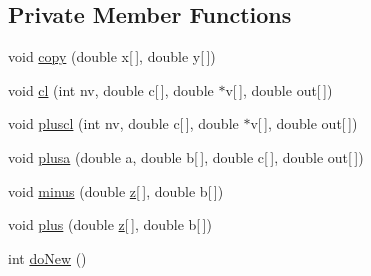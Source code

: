 \subsection*{Private Member Functions}
\begin{DoxyCompactItemize}
\item 
void \hyperlink{classodes_1_1Sdirkl_a551ed80826c89b46319388f4fe43bab3}{copy} (double x\mbox{[}$\,$\mbox{]}, double y\mbox{[}$\,$\mbox{]})
\item 
void \hyperlink{classodes_1_1Sdirkl_a82c82dad45f3aa657235fdc45a13cb00}{cl} (int nv, double c\mbox{[}$\,$\mbox{]}, double $\ast$v\mbox{[}$\,$\mbox{]}, double out\mbox{[}$\,$\mbox{]})
\item 
void \hyperlink{classodes_1_1Sdirkl_ab65a0cd648216dd6a5cbe201d9c6919b}{pluscl} (int nv, double c\mbox{[}$\,$\mbox{]}, double $\ast$v\mbox{[}$\,$\mbox{]}, double out\mbox{[}$\,$\mbox{]})
\item 
void \hyperlink{classodes_1_1Sdirkl_a2cbe256b0421cfb1db0ddb324a131821}{plusa} (double a, double b\mbox{[}$\,$\mbox{]}, double c\mbox{[}$\,$\mbox{]}, double out\mbox{[}$\,$\mbox{]})
\item 
void \hyperlink{classodes_1_1Sdirkl_afad3a6e0894199b67245e4b70a4967bc}{minus} (double \hyperlink{classodes_1_1Sdirkl_aa4de1776bba3e4dce817fc7fdb6067ac}{z}\mbox{[}$\,$\mbox{]}, double b\mbox{[}$\,$\mbox{]})
\item 
void \hyperlink{classodes_1_1Sdirkl_a17b2c0dfb6965b9a60f62fce24a908d3}{plus} (double \hyperlink{classodes_1_1Sdirkl_aa4de1776bba3e4dce817fc7fdb6067ac}{z}\mbox{[}$\,$\mbox{]}, double b\mbox{[}$\,$\mbox{]})
\item 
int \hyperlink{classodes_1_1Sdirkl_a84534aaeed64e8a9c11a156481ccd2e0}{do\-New} ()
\end{DoxyCompactItemize}
